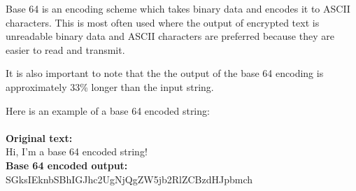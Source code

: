 Base 64 is an encoding scheme which takes binary data and encodes it to ASCII characters. This
is most often used where the output of encrypted text is unreadable binary data and ASCII
characters are preferred because they are easier to read and transmit. 

It is also important to note that the the output of the base 64 encoding is approximately
33\% longer than the input string.

Here is an example of a base 64 encoded string:\\\\
\textbf{Original text:}\\
Hi, I'm a base 64 encoded string!\\
\textbf{Base 64 encoded output:}\\
SGksIEknbSBhIGJhc2UgNjQgZW5jb2RlZCBzdHJpbmch
